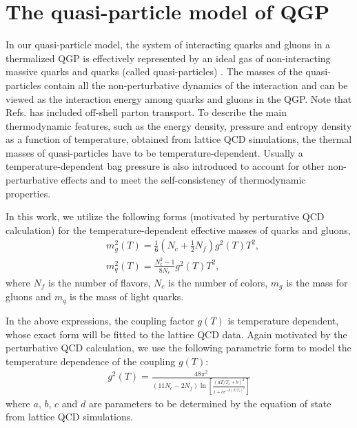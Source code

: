 \documentclass[aps,superscriptaddress,prc,twocolumn,nofootinbib]{revtex4}
\begin{document}
\section{The quasi-particle model of QGP}
\label{sec:QPM}

In our quasi-particle model, the system of interacting quarks and gluons in a thermalized QGP is effectively represented by an ideal gas of non-interacting massive quarks and quarks (called quasi-particles) \cite{Gorenstein:1995vm,Levai:1997yx,Bozek:1998dj,Bluhm:2004xn,Plumari:2011mk, Gossiaux:2009mk, Das:2015ana, Scardina:2017ipo}.
The masses of the quasi-particles contain all the non-perturbative dynamics of the interaction and can be viewed as the interaction energy among quarks and gluons in the QGP.
Note that Refs. \cite{Cassing:2008nn, Cassing:2008sv, Cassing:2009vt, Bratkovskaya:2011wp, Berrehrah:2014kba, Berrehrah:2015ywa,  Song:2015ykw} has included off-shell parton transport.
To describe the main thermodynamic features, such as the energy density, pressure and entropy density as a function of temperature, obtained from lattice QCD simulations, the thermal masses of quasi-particles have to be temperature-dependent.
Usually a temperature-dependent bag pressure is also introduced to account for other non-perturbative effects and to meet the self-consistency of thermodynamic properties.

In this work, we utilize the following forms (motivated by perturative QCD calculation) for the temperature-dependent effective masses of quarks and gluons,
\begin{align}
  \label{eq:boltzmann1}
  & m_g^2(T) =\frac{1}{6} \left(N_c+\frac{1}{2} N_f \right)  g^2(T) T^2, \\
  & m_{q}^2(T) =\frac{N_c^2-1}{8N_c}g^2(T) T^2,
\end{align}
where $N_f$ is the number of flavors, $N_c$ is the number of colors, $m_g$ is the mass for gluons and $m_{q}$ is the mass of light quarks.

In the above expressions, the coupling factor $g(T)$ is temperature dependent, whose exact form will be fitted to the lattice QCD data. Again motivated by the perturbative QCD calculation, we use the following parametric form to model the temperature dependence of the coupling $g(T)$:
\begin{align}
g^2(T)=\frac{48 \pi^2}{(11 N_c-2 N_f) \ln \left[\frac{\left(a T/T_\mathrm{c}+b\right)^2 }{1+c e^{-d (T/T_\mathrm{c})^2 }}\right]}
\end{align}
where $a$, $b$, $c$ and $d$ are parameters to be determined by the equation of state from lattice QCD simulations.
\end{document}
